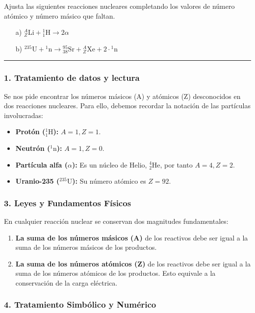 \begin{cajaenunciado}
Ajusta las siguientes reacciones nucleares completando los valores de número atómico y número másico que faltan.
\begin{enumerate}
    \item[a)] ${}_{Z}^{A}\text{Li} + {}_{1}^{1}\text{H} \rightarrow 2\alpha$
    \item[b)] ${}^{235}\text{U} + {}^{1}\text{n} \rightarrow {}_{38}^{95}\text{Sr} + {}_{Z}^{A}\text{Xe} + 2 \cdot {}^{1}\text{n}$
\end{enumerate}
\end{cajaenunciado}
\hrule

\subsubsection*{1. Tratamiento de datos y lectura}
Se nos pide encontrar los números másicos (A) y atómicos (Z) desconocidos en dos reacciones nucleares. Para ello, debemos recordar la notación de las partículas involucradas:
\begin{itemize}
    \item \textbf{Protón (${}_{1}^{1}\text{H}$):} $A=1, Z=1$.
    \item \textbf{Neutrón (${}^{1}\text{n}$):} $A=1, Z=0$.
    \item \textbf{Partícula alfa ($\alpha$):} Es un núcleo de Helio, ${}_{2}^{4}\text{He}$, por tanto $A=4, Z=2$.
    \item \textbf{Uranio-235 (${}^{235}\text{U}$):} Su número atómico es $Z=92$.
\end{itemize}

\subsubsection*{3. Leyes y Fundamentos Físicos}
En cualquier reacción nuclear se conservan dos magnitudes fundamentales:
\begin{enumerate}
    \item \textbf{La suma de los números másicos (A)} de los reactivos debe ser igual a la suma de los números másicos de los productos.
    \item \textbf{La suma de los números atómicos (Z)} de los reactivos debe ser igual a la suma de los números atómicos de los productos. Esto equivale a la conservación de la carga eléctrica.
\end{enumerate}

\subsubsection*{4. Tratamiento Simbólico y Numérico}
